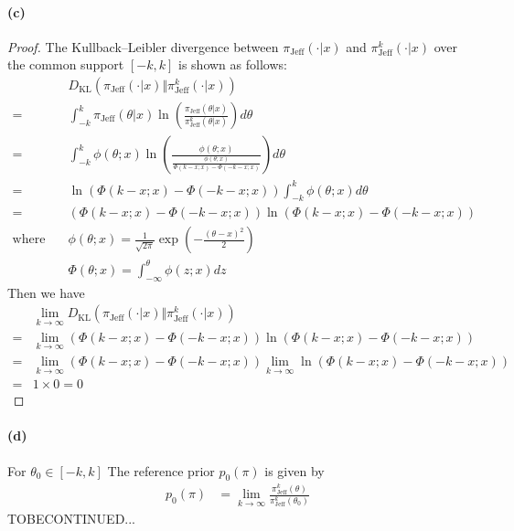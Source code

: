 \paragraph{(c)}
\begin{proof}
The Kullback–Leibler divergence between $\pi_\mathrm{Jeff} (\cdot \vert x)$ and $\pi_\mathrm{Jeff}^k (\cdot \vert x)$ over the common support $[-k, k]$ is shown as follows:
\begin{align*}
    &D_{\mathrm{KL}}\left( \pi_\mathrm{Jeff} (\cdot \vert x) \Vert \pi_\mathrm{Jeff}^k (\cdot \vert x)\right)\\
    =& \int_{-k}^{k}  \pi_\mathrm{Jeff} (\theta \vert x)
        \ln \left( \frac{\pi_\mathrm{Jeff} (\theta \vert x)}{\pi_\mathrm{Jeff}^k (\theta \vert x)} \right) d\theta \\
    =& \int_{-k}^{k}  \phi(\theta; x) \ln \left( 
        \frac{\phi(\theta; x)}{ \frac{\phi(\theta;x)}{\Phi(k-x;x) - \Phi(-k-x;x)}}
        \right)d\theta \\
    =& \ln \left( \Phi(k-x;x) - \Phi(-k-x;x) \right) \int_{-k}^{k}
        \phi(\theta;x)d\theta\\
    =& \left( \Phi(k-x;x) - \Phi(-k-x;x) \right) \ln \left( \Phi(k-x;x) - \Phi(-k-x;x) \right)\\
    \text{where}\quad
    &\phi(\theta;x) = \frac{1}{\sqrt{2\pi}}\exp \left( -\frac{(\theta - x)^2}{2}\right)\\
    &\Phi(\theta;x) = \int_{-\infty}^{\theta} \phi(z;x) dz
\end{align*}
Then we have
\begin{align*}
    &\lim_{k\rightarrow \infty} D_{\mathrm{KL}}\left( \pi_\mathrm{Jeff} (\cdot \vert x) \Vert \pi_\mathrm{Jeff}^k (\cdot \vert x)\right)\\
    =&\lim_{k\rightarrow \infty} \left( \Phi(k-x;x) - \Phi(-k-x;x) \right) \ln \left( \Phi(k-x;x) - \Phi(-k-x;x) \right)\\
    =& \lim_{k\rightarrow \infty} \left( \Phi(k-x;x) - \Phi(-k-x;x) \right)
        \lim_{k\rightarrow \infty}\ln \left( \Phi(k-x;x) - \Phi(-k-x;x) \right)\\
    =& 1\times 0 = 0
\end{align*}
\end{proof}

\paragraph{(d)}
For $\theta_0 \in [-k, k]$ The reference prior $p_0(\pi)$ is given by
\begin{align*}
    p_0(\pi)
    &= \lim_{k\rightarrow \infty} \frac{\pi_\mathrm{Jeff}^k (\theta)}{\pi_\mathrm{Jeff}^k (\theta_0)}
\end{align*}
{
\color{red}
TOBECONTINUED...
}